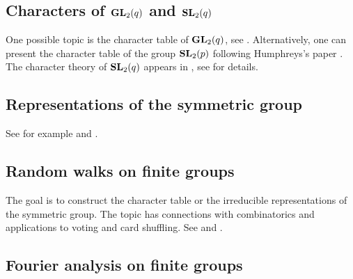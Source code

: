 



\subsection*{Characters of $\mathbf{GL}_2(q)$ and $\mathbf{SL}_2(q)$}

One possible topic is the character table of $\mathbf{GL}_2(q)$, see
\cite[\S5.2]{MR2867444}. Alternatively, one can 
present the character table of the group $\mathbf{SL}_2(p)$  
following Humphreys's paper \cite{MR364478}. 
The character theory of $\mathbf{SL}_2(q)$ appears in 
\cite[\S5.2]{MR2867444}, see 
\cite[Chapter 20]{MR1650707} for details. 

\subsection*{Representations of the symmetric group}

See for example \cite[\S10]{MR2867444} and 
\cite{MR1153249}. 

\subsection*{Random walks on finite groups}

The goal is to construct the character table or 
the irreducible representations of the symmetric group. 
The topic has connections with combinatorics and applications 
to voting and card shuffling. 
See \cite[4]{MR1153249} and \cite[\S11]{MR2867444}.

\subsection*{Fourier analysis on finite groups}

